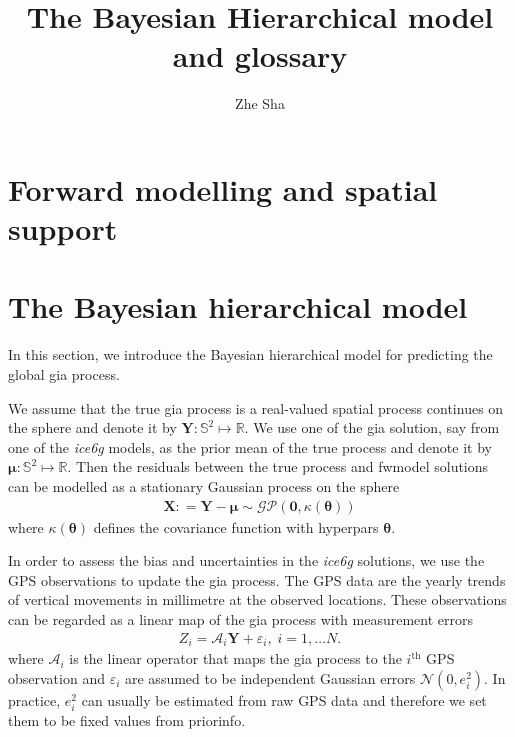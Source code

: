 \documentclass[a4paper,12pt]{article}
\begin{document}
 \title{The Bayesian Hierarchical model and glossary}
\author{Zhe Sha}
\maketitle

\onehalfspacing
{}



\section{Forward modelling and spatial support}



\section{The Bayesian hierarchical model}
In this section, we introduce the Bayesian hierarchical model for predicting the global \acrshort{gia} process. 

We assume that the true \acrshort{gia} process is a real-valued spatial process continues on the sphere and denote it by $\bm{Y}: \mathbb{S}^2 \mapsto \mathbb{R}$. We use one of the \acrshort{gia} solution, say from one of the \emph{ice6g} models, as the prior mean of the true process and denote it by $\bm{\mu}: \mathbb{S}^2 \mapsto \mathbb{R}$. Then the residuals between the true process and \gls{fwmodel} solutions can be modelled as a stationary Gaussian process on the sphere 
\begin{align}\label{eq:GIAresid}
 \bm{X}: = \bm{Y} - \bm{\mu} \sim \mathcal{GP}(\bm{0}, \kappa(\bm{\theta}))
\end{align}
where $\kappa(\bm{\theta})$ defines the covariance function with \gls{hyperpars} $\bm{\theta}$.

In order to assess the bias and uncertainties in the \emph{ice6g} solutions, we use the GPS observations to update the \acrshort{gia} process. The GPS  data are the yearly trends of vertical movements in millimetre at the observed locations. These observations can be regarded as a linear map of the \acrshort{gia} process with measurement errors
\begin{align}\label{eq:GPSi}
Z_i = \bm{\mathcal{A}}_i\bm{Y} + \varepsilon_i, \; i = 1,\dots N.
\end{align} 
where $\bm{\mathcal{A}}_i$ is the linear operator that maps the \acrshort{gia} process to the $i^{\mbox{th}}$ GPS observation and $\varepsilon_i$ are assumed to be independent Gaussian errors $\mathcal{N}(0, e_i^2)$. In practice, $e_i^2$ can usually be estimated from raw GPS data and therefore we set them to be fixed values from \gls{priorinfo}. 
\end{document}
